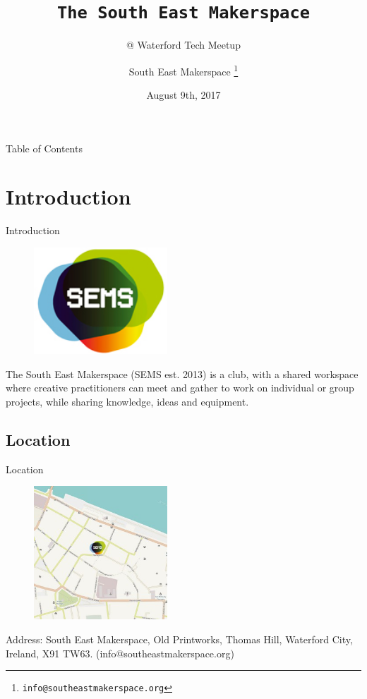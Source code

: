 \documentclass{beamer}
\title{\texttt{The South East Makerspace}}
\subtitle{@ Waterford Tech Meetup}
\author{South East Makerspace \footnote{\texttt{info@southeastmakerspace.org}}}
\date{August 9th, 2017}
\begin{document}
\begin{frame}
  \maketitle
\end{frame}


\begin{frame}{Table of Contents}
  \tableofcontents
\end{frame}

\section{Introduction}
\begin{frame}{Introduction}
%
\begin{figure}
	\centering
	\includegraphics[width=5cm]{images/test}
	\label{fig:logo}
\end{figure}
%

The South East Makerspace (SEMS est. 2013) is a club, with a shared workspace where creative practitioners can meet and gather to work on individual or group projects, while sharing knowledge, ideas and equipment.
\end{frame}

\subsection{Location}
\begin{frame}{Location}
	\begin{figure}
		\centering
		\includegraphics[width=5cm]{images/sems_1}
		\label{fig:logo1}
	\end{figure}
	
	Address: South East Makerspace, Old Printworks, Thomas Hill, Waterford City, Ireland, X91 TW63. (info@southeastmakerspace.org)
\end{frame}
\end{document}
